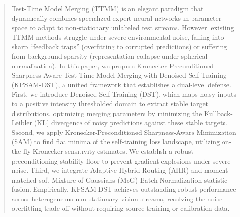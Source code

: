 \documentclass{article}
\theoremstyle{plain}
\theoremstyle{definition}
\theoremstyle{remark}
\begin{document}

\printAffiliationsAndNotice{}

\begin{abstract}
  Test-Time Model Merging (TTMM) is an elegant paradigm that dynamically combines specialized expert neural networks in parameter space to adapt to non-stationary unlabeled test streams. However, existing TTMM methods struggle under severe environmental noise, falling into sharp ``feedback traps'' (overfitting to corrupted predictions) or suffering from background sparsity (representation collapse under spherical normalization). In this paper, we propose Kronecker-Preconditioned Sharpness-Aware Test-Time Model Merging with Denoised Self-Training (KPSAM-DST), a unified framework that establishes a dual-level defense. First, we introduce Denoised Self-Training (DST), which maps noisy inputs to a positive intensity thresholded domain to extract stable target distributions, optimizing merging parameters by minimizing the Kullback-Leibler (KL) divergence of noisy predictions against these stable targets. Second, we apply Kronecker-Preconditioned Sharpness-Aware Minimization (SAM) to find flat minima of the self-training loss landscape, utilizing on-the-fly Kronecker sensitivity estimates. We establish a robust preconditioning stability floor to prevent gradient explosions under severe noise. Third, we integrate Adaptive Hybrid Routing (AHR) and moment-matched soft Mixture-of-Gaussians (MoG) Batch Normalization statistic fusion. Empirically, KPSAM-DST achieves outstanding robust performance across heterogeneous non-stationary vision streams, resolving the noise-overfitting trade-off without requiring source training or calibration data.
\end{abstract}
\end{document}
